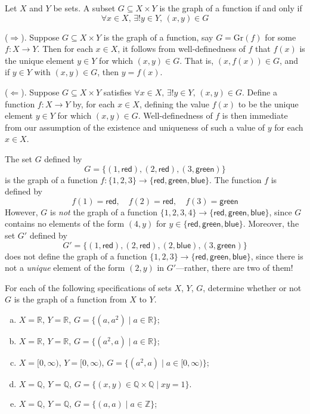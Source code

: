 \begin{theorem}
\label{thmFunctionsAsGraphs}
Let $X$ and $Y$ be sets. A subset $G \subseteq X \times Y$ is the graph of a function if and only if
\[ \forall x \in X,\, \exists ! y \in Y,\, (x,y) \in G \]
\end{theorem}
\begin{cproof}
($\Rightarrow$). Suppose $G \subseteq X \times Y$ is the graph of a function, say $G = \mathrm{Gr}(f)$ for some $f : X \to Y$. Then for each $x \in X$, it follows from well-definedness of $f$ that $f(x)$ is the unique element $y \in Y$ for which $(x, y) \in G$. That is, $(x,f(x)) \in G$, and if $y \in Y$ with $(x,y) \in G$, then $y=f(x)$.

($\Leftarrow$). Suppose $G \subseteq X \times Y$ satisfies $\forall x \in X,\, \exists ! y \in Y,\, (x,y) \in G$. Define a function $f : X \to Y$ by, for each $x \in X$, defining the value $f(x)$ to be the unique element $y \in Y$ for which $(x,y) \in G$. Well-definedness of $f$ is then immediate from our assumption of the existence and uniqueness of such a value of $y$ for each $x \in X$.
\end{cproof}

\begin{example}
The set $G$ defined by
\[ G = \{ (1, \mathsf{red}), (2, \mathsf{red}), (3, \mathsf{green}) \} \]
is the graph of a function $f : \{ 1, 2, 3 \} \to \{ \mathsf{red}, \mathsf{green}, \mathsf{blue} \}$. The function $f$ is defined by
\[ f(1) = \mathsf{red}, \quad f(2) = \mathsf{red}, \quad f(3) = \mathsf{green} \]
However, $G$ is \textit{not} the graph of a function $\{ 1, 2, 3, 4 \} \to \{ \mathsf{red}, \mathsf{green}, \mathsf{blue} \}$, since $G$ contains no elements of the form $(4,y)$ for $y \in \{ \mathsf{red}, \mathsf{green}, \mathsf{blue} \}$. Moreover, the set $G'$ defined by
\[ G' = \{ (1, \mathsf{red}), (2, \mathsf{red}), (2, \mathsf{blue}), (3, \mathsf{green}) \} \]
does not define the graph of a function $\{ 1, 2, 3 \} \to \{ \mathsf{red}, \mathsf{green}, \mathsf{blue} \}$, since there is not a \textit{unique} element of the form $(2,y)$ in $G'$---rather, there are two of them!
\end{example}

\begin{exercise}
For each of the following specifications of sets $X$, $Y$, $G$, determine whether or not $G$ is the graph of a function from $X$ to $Y$.
\begin{enumerate}[(a)]
\item $X = \mathbb{R}$, $Y = \mathbb{R}$, $G = \{ (a, a^2) \mid a \in \mathbb{R} \}$;
\item $X = \mathbb{R}$, $Y = \mathbb{R}$, $G = \{ (a^2, a) \mid a \in \mathbb{R} \}$;
\item $X = [0, \infty)$, $Y = [0, \infty)$, $G = \{ (a^2, a) \mid a \in [0, \infty) \}$;
\item $X = \mathbb{Q}$, $Y = \mathbb{Q}$, $G = \{ (x, y) \in \mathbb{Q} \times \mathbb{Q} \mid xy = 1 \}$.
\item $X = \mathbb{Q}$, $Y = \mathbb{Q}$, $G = \{ (a, a) \mid a \in \mathbb{Z} \}$;
\end{enumerate}
\end{exercise}


